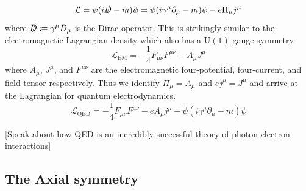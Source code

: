 \documentclass[11pt, a4paper]{article}
\theoremstyle{definition}
\theoremstyle{plain}
\begin{document}
\begin{equation}
  \mathcal{L} = \bar{\psi}(i\slashed{D} - m)\psi
  = \bar{\psi}(i \gamma^\mu\partial_\mu - m)\psi -e\Pi_\mu j^\mu
\end{equation}
where $\slashed{D} \coloneq \gamma^\mu D_\mu$ is the Dirac operator.
This is strikingly similar to the electromagnetic Lagrangian density which
also has a $\mathrm{U}(1)$ gauge symmetry
\begin{equation}
  \mathcal{L}_\mathrm{EM} = -\frac{1}{4}F_{\mu\nu}F^{\mu\nu} -A_\mu J^\mu
\end{equation}
where $A_\mu$, $J^\mu$, and $F^{\mu\nu}$ are the electromagnetic four-potential, four-current,
and field tensor respectively. Thus we identify $\Pi_\mu = A_\mu$ and $ej^\mu = J^\mu$
and arrive at the Lagrangian for quantum electrodynamics.
\begin{equation}
  \mathcal{L}_\mathrm{QED} = -\frac{1}{4}F_{\mu\nu}F^{\mu\nu} -eA_\mu j^\mu
    + \bar{\psi}(i \gamma^\mu\partial_\mu - m)\psi
\end{equation}

[Speak about how QED is an incredibly successful theory of photon-electron interactions]


\subsection{The Axial symmetry}
\end{document}
